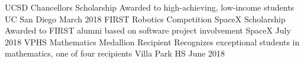 \documentclass[]{awesome-cv}
\begin{document}
\vspace{-5mm}
\begin{cvhonors}
	\cvhonor
	{UCSD Chancellor\textquotesingle{}s Scholarship}
	{Awarded to high-achieving, low-income students}
	{UC San Diego}
	{March 2018}
	\cvhonor
	{FIRST Robotics Competition SpaceX Scholarship}
	{Awarded to FIRST alumni based on software project involvement}
	{SpaceX}
	{July 2018}
	\cvhonor
	{VPHS Mathematics Medallion Recipient}
	{Recognizes exceptional students in mathematics, one of four recipients}
	{Villa Park HS}
	{June 2018}
\end{cvhonors}
\end{document}
